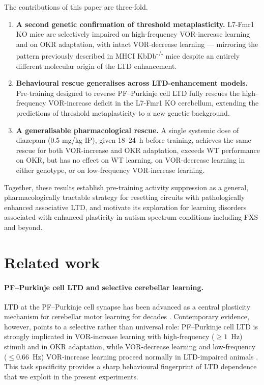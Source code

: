 \documentclass[11pt]{article}
\begin{document}
The contributions of this paper are three-fold.
\begin{enumerate}
  \item \textbf{A second genetic confirmation of threshold metaplasticity.}
  L7-Fmr1 KO mice are selectively impaired on high-frequency VOR-increase
  learning and on OKR adaptation, with intact VOR-decrease learning ---
  mirroring the pattern previously described in
  MHCI KbDb\textsuperscript{-/-} mice despite an entirely different
  molecular origin of the LTD enhancement.
  \item \textbf{Behavioural rescue generalises across LTD-enhancement
  models.} Pre-training designed to reverse PF--Purkinje cell LTD fully
  rescues the high-frequency VOR-increase deficit in the L7-Fmr1 KO
  cerebellum, extending the predictions of threshold metaplasticity to a
  new genetic background.
  \item \textbf{A generalisable pharmacological rescue.} A single systemic
  dose of diazepam (0.5 mg/kg IP), given 18--24~h before training,
  achieves the same rescue for both VOR-increase and OKR adaptation,
  exceeds WT performance on OKR, but has no effect on WT learning, on
  VOR-decrease learning in either genotype, or on low-frequency
  VOR-increase learning.
\end{enumerate}
Together, these results establish pre-training activity suppression as a
general, pharmacologically tractable strategy for resetting circuits with
pathologically enhanced associative LTD, and motivate its exploration for
learning disorders associated with enhanced plasticity in autism spectrum
conditions including FXS and beyond.

\section{Related work}

\paragraph{PF--Purkinje cell LTD and selective cerebellar learning.}
LTD at the PF--Purkinje cell synapse has been advanced as a central plasticity
mechanism for cerebellar motor learning for decades
\citep{boyden2004cerebellum}. Contemporary evidence, however, points to a
selective rather than universal role: PF--Purkinje cell LTD is strongly
implicated in VOR-increase learning with high-frequency ($\geq 1$~Hz)
stimuli and in OKR adaptation, while VOR-decrease learning and low-frequency
($\leq 0.66$~Hz) VOR-increase learning proceed normally in LTD-impaired
animals \citep{boyden2004cerebellum, raymond2018cerebellum, kimpo2005vor,
kimpo2014gating, inoshita2018okr, takeuchi2008delphilin, rowan2018graded,
nguyenvu2017saturation}. This task specificity provides a sharp behavioural
fingerprint of LTD dependence that we exploit in the present experiments.
\end{document}
